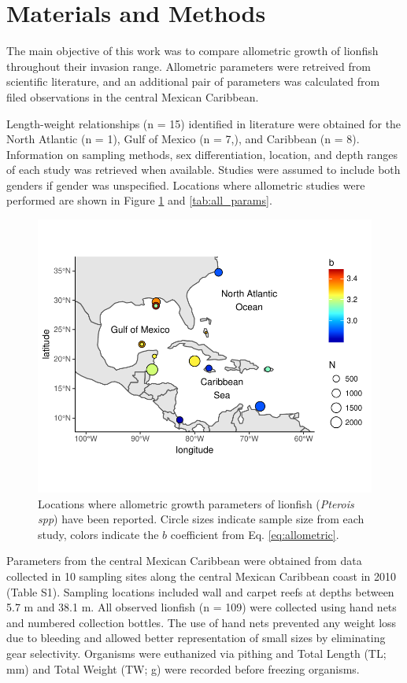 \documentclass[fleqn,10pt,lineno]{wlpeerj} %
\begin{document}
\section*{Materials and Methods}

The main objective of this work was to compare allometric growth of
lionfish throughout their invasion range. Allometric parameters were
retreived from scientific literature, and an additional pair of
parameters was calculated from filed observations in the central Mexican
Caribbean.

Length-weight relationships (n = 15) identified in literature were
obtained for the North Atlantic (n = 1), Gulf of Mexico (n = 7,), and
Caribbean (n = 8). Information on sampling methods, sex differentiation,
location, and depth ranges of each study was retrieved when available.
Studies were assumed to include both genders if gender was unspecified.
Locations where allometric studies were performed are shown in Figure
\ref{fig:map} and \ref{tab:all_params}.

\clearpage

\begin{figure}
\centering
\includegraphics{Manuscript_files/figure-latex/unnamed-chunk-1-1.pdf}
\caption{\label{fig:map}Locations where allometric growth parameters of
lionfish (\emph{Pterois spp}) have been reported. Circle sizes indicate
sample size from each study, colors indicate the \(b\) coefficient from
Eq. \ref{eq:allometric}.}
\end{figure}

Parameters from the central Mexican Caribbean were obtained from data
collected in 10 sampling sites along the central Mexican Caribbean coast
in 2010 (Table S1). Sampling locations included wall and carpet reefs at
depths between 5.7 m and 38.1 m. All observed lionfish (n = 109) were
collected using hand nets and numbered collection bottles. The use of
hand nets prevented any weight loss due to bleeding and allowed better
representation of small sizes by eliminating gear selectivity. Organisms
were euthanized via pithing and Total Length (TL; mm) and Total Weight
(TW; g) were recorded before freezing organisms.
\end{document}
